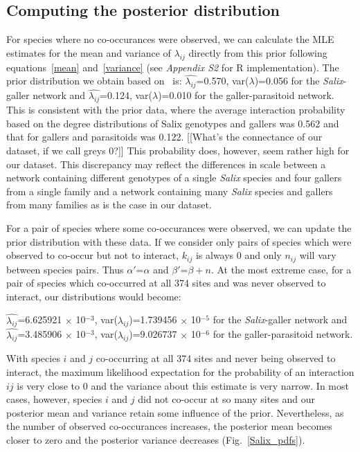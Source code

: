 \documentclass[12pt]{article}
\begin{document}
    \subsection*{Computing the posterior distribution}

      For species where no co-occurances were observed, we can 
      calculate the MLE estimates for the mean and variance of 
      $\lambda_{ij}$ directly from this prior following 
      equations~\ref{mean} and~\ref{variance} 
      (see \emph{Appendix S2} for R implementation). The prior 
      distribution we obtain based on~\citet{Barbour2016,Barbour2016Dryad} is:
      $\hat{\lambda_{ij}}$=0.570, var($\lambda$)=0.056 for the \emph{Salix}-galler network and $\hat{\lambda_{ij}}$=0.124, var($\lambda$)=0.010 for the galler-parasitoid network.
      This is consistent with the prior data, where the average 
      interaction probability based on the degree distributions of Salix genotypes and gallers was 0.562 and that for gallers and parasitoids was 0.122. [[What's the connectance of our dataset, if we call greys 0?]] This probability does, however, seem rather high for our dataset. This discrepancy may reflect the differences in scale between a network containing different genotypes of a single \emph{Salix} species and four gallers from a single family and a network containing many \emph{Salix} species and gallers from many families as is the case in our dataset.


      For a pair of species where some co-occurances were observed, we can update the prior distribution with these data. If we consider only pairs of species which were observed to co-occur but not to interact, $k_{ij}$ is always 0 and only $n_{ij}$ will vary between species pairs. Thus $\alpha'$=$\alpha$ and $\beta'$=$\beta + n$. At the most extreme case, for a pair of species which co-occurred at all 374 sites and was never observed to interact, our distributions would become:


      $\hat{\lambda_{ij}}$=6.625921 $\times$ 10$^{-3}$, var($\lambda_{ij}$)=1.739456 $\times$ 10$^{-5}$ for the \emph{Salix}-galler network and 
      $\hat{\lambda_{ij}}$=3.485906 $\times$ 10$^{-3}$, var($\lambda_{ij}$)=9.026737 $\times$ 10$^{-6}$ for the galler-parasitoid network.

      
      With species $i$ and $j$ co-occurring at all 374 sites and never being observed to interact, the maximum likelihood expectation for the probability of an interaction $ij$ is very close to 0 and the variance about this estimate is very narrow. In most cases, however, species $i$ and $j$ did not co-occur at so many sites and our posterior mean and variance retain some influence of the prior. Nevertheless, as the number of observed co-occurances increases, the posterior mean becomes closer to zero and the posterior variance decreases (Fig.~\ref{Salix_pdfs}).
\end{document}
